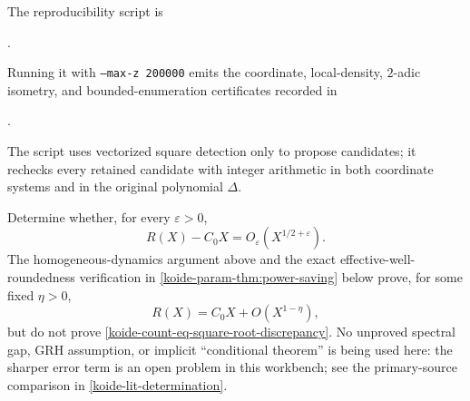 The reproducibility script is
\begin{center}
 .
\end{center}
Running it with \texttt{--max-z 200000} emits the coordinate, local-density,
$2$-adic isometry, and bounded-enumeration certificates recorded in
\begin{center}
 .
\end{center}
The script uses vectorized square detection only to propose candidates; it
rechecks every retained candidate with integer arithmetic in both coordinate
systems and in the original polynomial $\Delta$.

\begin{test}
\label{koide-count-open-square-root-discrepancy}
\Open Determine whether, for every \(\varepsilon>0\),
\begin{equation}
 R(X)-C_0X=O_\varepsilon(X^{1/2+\varepsilon}).
 \label{koide-count-eq-square-root-discrepancy}
\end{equation}
The homogeneous-dynamics argument above and the exact
effective-well-roundedness verification in
\cref{koide-param-thm:power-saving} below prove, for some fixed
\(\eta>0\),
\[
 R(X)=C_0X+O(X^{1-\eta}),
\]
but do not prove
\eqref{koide-count-eq-square-root-discrepancy}.  No unproved spectral gap,
GRH assumption, or implicit ``conditional theorem'' is being used here:
the sharper error term is an open problem in this workbench; see the
primary-source comparison in
\cref{koide-lit-determination}.
\end{test}





